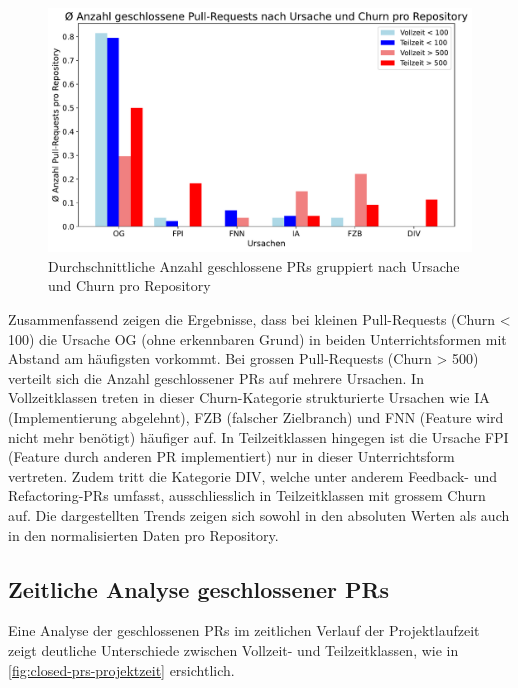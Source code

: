 \begin{figure}[htbp]
    \includegraphics[width=\textwidth]{Figures/ursachenanalyse-pro-repo.pdf}
    \caption{Durchschnittliche Anzahl geschlossene PRs gruppiert nach Ursache und Churn pro Repository}
    \label{fig:avg-avg-anz-clsd-prs-nach-ursache-und-churn}
\end{figure}

Zusammenfassend zeigen die Ergebnisse, dass bei kleinen Pull-Requests (Churn < 100) die Ursache OG (ohne erkennbaren Grund) in beiden Unterrichtsformen mit Abstand am häufigsten vorkommt. Bei grossen Pull-Requests (Churn > 500) verteilt sich die Anzahl geschlossener PRs auf mehrere Ursachen. In Vollzeitklassen treten in dieser Churn-Kategorie strukturierte Ursachen wie IA (Implementierung abgelehnt), FZB (falscher Zielbranch) und FNN (Feature wird nicht mehr benötigt) häufiger auf. In Teilzeitklassen hingegen ist die Ursache FPI (Feature durch anderen PR implementiert) nur in dieser Unterrichtsform vertreten. Zudem tritt die Kategorie DIV, welche unter anderem Feedback- und Refactoring-PRs umfasst, ausschliesslich in Teilzeitklassen mit grossem Churn auf. Die dargestellten Trends zeigen sich sowohl in den absoluten Werten als auch in den normalisierten Daten pro Repository.

\subsection{Zeitliche Analyse geschlossener PRs}

Eine Analyse der geschlossenen PRs im zeitlichen Verlauf der Projektlaufzeit zeigt deutliche Unterschiede zwischen Vollzeit- und Teilzeitklassen, wie in \autoref{fig:closed-prs-projektzeit} ersichtlich.

